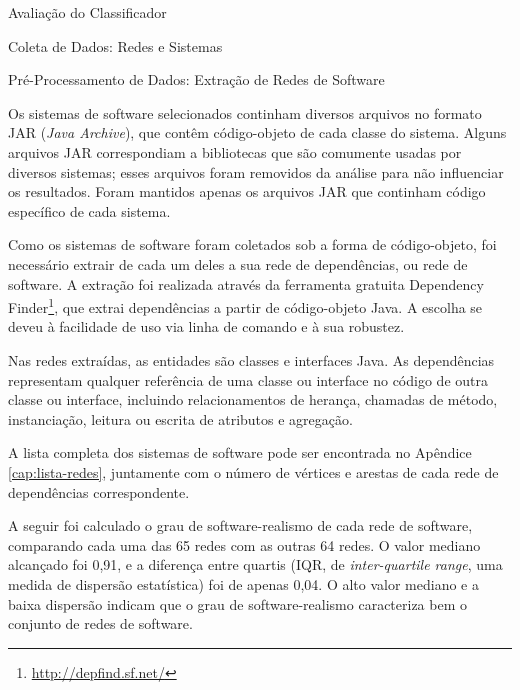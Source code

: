 \begin{section}{Avaliação do Classificador}
\begin{subsection}{Coleta de Dados: Redes e Sistemas}

\end{subsection}

\begin{subsection}{Pré-Processamento de Dados: Extração de Redes de Software}

	Os sistemas de software selecionados continham diversos arquivos no formato JAR (\emph{Java Archive}), que contêm código-objeto de cada classe do sistema. Alguns arquivos JAR correspondiam a bibliotecas que são comumente usadas por diversos sistemas; esses arquivos foram removidos da análise para não influenciar os resultados. Foram mantidos apenas os arquivos JAR que continham código específico de cada sistema.
	
	Como os sistemas de software foram coletados sob a forma de código-objeto, foi necessário extrair de cada um deles a sua rede de dependências, ou rede de software. A extração foi realizada através da ferramenta gratuita Dependency Finder\footnote{\url{http://depfind.sf.net/}}, que extrai dependências a partir de código-objeto Java. A escolha se deveu à facilidade de uso via linha de comando e à sua robustez.

	Nas redes extraídas, as entidades são classes e interfaces Java. As dependências representam qualquer referência de uma classe ou interface no código de outra classe ou interface, incluindo relacionamentos de herança, chamadas de método, instanciação, leitura ou escrita de atributos e agregação.

	A lista completa dos sistemas de software pode ser encontrada no Apêndice \ref{cap:lista-redes}, juntamente com o número de vértices e arestas de cada rede de dependências correspondente. %
	
	A seguir foi calculado o grau de software-realismo de cada rede de software, comparando cada uma das 65 redes com as outras 64 redes. O valor mediano alcançado foi 0,91, e a diferença entre quartis (IQR, de \emph{inter-quartile range}, uma medida de dispersão estatística) foi de apenas 0,04. O alto valor mediano e a baixa dispersão indicam que o grau de software-realismo caracteriza bem o conjunto de redes de software.
	

\end{subsection}
\end{section}
